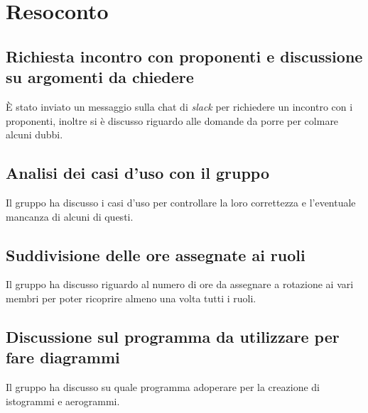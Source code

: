 \documentclass[a4paper]{article}
\begin{document}
    \section{Resoconto}
    
        \subsection{Richiesta incontro con proponenti e discussione su argomenti da chiedere}
        È stato inviato un messaggio sulla chat di \textit{slack} per richiedere un incontro con i proponenti, inoltre si è discusso riguardo alle domande da porre per colmare alcuni dubbi.
        
        \subsection{Analisi dei casi d'uso con il gruppo}
        Il gruppo ha discusso i casi d'uso per controllare la loro correttezza e l'eventuale mancanza di alcuni di questi.

        \subsection{Suddivisione delle ore assegnate ai ruoli}
        Il gruppo ha discusso riguardo al numero di ore da assegnare a rotazione ai vari membri per poter ricoprire almeno una volta tutti i ruoli.

        \subsection{Discussione sul programma da utilizzare per fare diagrammi}
        Il gruppo ha discusso su quale programma adoperare per la creazione di istogrammi e aerogrammi.
\end{document}
